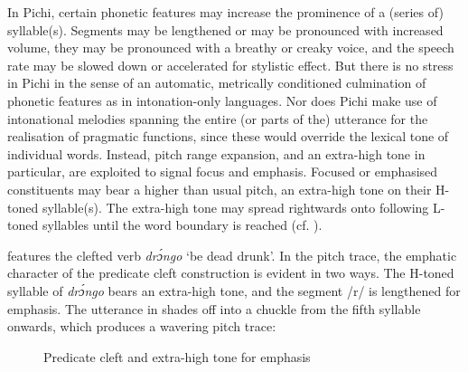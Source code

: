 In Pichi, certain phonetic features may increase the prominence of a (series of) syllable(s). Segments may be lengthened or may be pronounced with increased volume, they may be pronounced with a breathy or creaky voice, and the speech rate may be slowed down or accelerated for stylistic effect. But there is no stress in Pichi in the sense of an automatic, metrically conditioned culmination of phonetic features as in intonation-only languages. Nor does Pichi make use of intonational melodies spanning the entire (or parts of the) utterance for the realisation of pragmatic functions, since these would override the lexical tone of individual words. Instead, pitch range expansion, and an extra-high tone in particular, are exploited to signal focus and emphasis. Focused or emphasised constituents may bear a higher than usual pitch, an extra-high tone on their H-toned syllable(s). The extra-high tone may spread rightwards onto following L-toned syllables until the word boundary is reached (cf. ). 

 features the clefted verb \textit{drɔ́ngo} ‘be dead drunk’. In the pitch trace, the emphatic character of the predicate cleft construction is evident in two ways. The H-toned syllable of \textit{drɔ́ngo} bears an extra-high tone, and the segment /r/ is lengthened for emphasis. The utterance in  shades off into a chuckle from the fifth syllable onwards, which produces a wavering pitch trace:

\begin{figure}
\caption{Predicate cleft and extra-high tone for emphasis}
\label{fig:key:3.23}
\end{figure}
 


